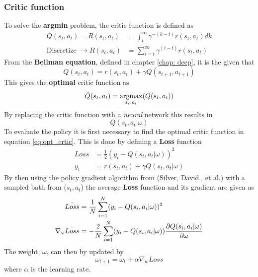 \subsubsection{Critic function}
To solve the \textbf{argmin} problem, the critic function is defined as
\begin{align}
    Q(s_{t},a_{t}) = R(s_{t}, a_{t}) & = \int_{t}^{\infty} \gamma^{-(k-t)}r(s_{t},a_{t})dk \\
    \text{Discretize } \longrightarrow R(s_{t},a_{t}) & = \sum_{i=t}^{\infty} \gamma^{(i-t)}r(s_{t}, a_{t})
\end{align}
From the \textbf{Bellman equation}, defined in chapter \ref{chap: deep}, it is the given that
\begin{equation}
    Q(s_{t},a_{t}) = r(s_{t},a_{t})+\gamma Q(s_{t+1}, a_{t+1})
\end{equation}
This gives the \textbf{optimal} critic function as
\begin{equation}
    \Hat{Q}(s_{t},a_{t}) = \operatorname*{argmax}_{s_{t},a_{t}}(Q(s_{t},a_{t}))
    \label{eq:opt_crtic}
\end{equation}
By replacing the critic function with a \textit{neural} network this results in
\begin{equation}
    Q(s_{t},a_{t}|\omega)
\end{equation}
To evaluate the policy it is first necessary to find the optimal critic function in equation \ref{eq:opt_crtic}. This is done by defining a \textbf{Loss} function
\begin{align}
    Loss & = \frac{1}{2}(y_{t}-Q(s_{t},a_{t}|\omega))^{2} \\
    y_{t} & = r(s_{t}, a_{t})+\gamma Q(s_{t}, a_{t}|\omega)
\end{align}
By then using the policy gradient algorithm from (Silver, David., et al.) \cite{David} with a sampled bath from ($s_{t}, a_{t}$) the average \textbf{Loss} function and its gradient are given as
\begin{align}
   \Bar{Loss} & = \frac{1}{N}\sum_{i=1}^{N}(y_{i}-Q(s_{i},a_{i}|\omega))^{2} \\
   \nabla_{\omega}\Bar{Loss} & = -\frac{2}{N}\sum_{i=1}^{N}(y_{i}-Q(s_{i},a_{i}|\omega))\frac{\partial Q(s_{i},a_{i}|\omega)}{\partial \omega}
\end{align}
The weight, $\omega$, can then by updated by 
\begin{equation}
    \omega_{t+1} = \omega_{t} + \alpha\nabla_{w}Loss
\end{equation}
where $\alpha$ is the learning rate. 
